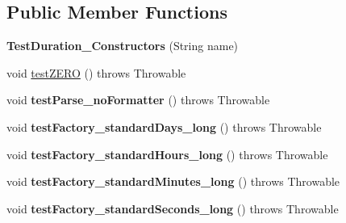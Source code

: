 \subsection*{Public Member Functions}
\begin{DoxyCompactItemize}
\item 
\hypertarget{classorg_1_1joda_1_1time_1_1_test_duration___constructors_aaa9960e3e894d063e7a536c8a3e4f598}{{\bfseries Test\-Duration\-\_\-\-Constructors} (String name)}\label{classorg_1_1joda_1_1time_1_1_test_duration___constructors_aaa9960e3e894d063e7a536c8a3e4f598}

\item 
void \hyperlink{classorg_1_1joda_1_1time_1_1_test_duration___constructors_a2bf73282bf9030fbbede3792757c108d}{test\-Z\-E\-R\-O} ()  throws Throwable 
\item 
\hypertarget{classorg_1_1joda_1_1time_1_1_test_duration___constructors_a03d70f5ef15df5aa9837e916fb08fac9}{void {\bfseries test\-Parse\-\_\-no\-Formatter} ()  throws Throwable }\label{classorg_1_1joda_1_1time_1_1_test_duration___constructors_a03d70f5ef15df5aa9837e916fb08fac9}

\item 
\hypertarget{classorg_1_1joda_1_1time_1_1_test_duration___constructors_afa349a990d31c019386716c2e4c9998a}{void {\bfseries test\-Factory\-\_\-standard\-Days\-\_\-long} ()  throws Throwable }\label{classorg_1_1joda_1_1time_1_1_test_duration___constructors_afa349a990d31c019386716c2e4c9998a}

\item 
\hypertarget{classorg_1_1joda_1_1time_1_1_test_duration___constructors_a8a921503d13a34eccce9e5d46bfadfe5}{void {\bfseries test\-Factory\-\_\-standard\-Hours\-\_\-long} ()  throws Throwable }\label{classorg_1_1joda_1_1time_1_1_test_duration___constructors_a8a921503d13a34eccce9e5d46bfadfe5}

\item 
\hypertarget{classorg_1_1joda_1_1time_1_1_test_duration___constructors_a884f44931d26ad6f3ac1f2f514fc6dc2}{void {\bfseries test\-Factory\-\_\-standard\-Minutes\-\_\-long} ()  throws Throwable }\label{classorg_1_1joda_1_1time_1_1_test_duration___constructors_a884f44931d26ad6f3ac1f2f514fc6dc2}

\item 
\hypertarget{classorg_1_1joda_1_1time_1_1_test_duration___constructors_aeb4bae613eba58f1468fd9021e5b0b57}{void {\bfseries test\-Factory\-\_\-standard\-Seconds\-\_\-long} ()  throws Throwable }\label{classorg_1_1joda_1_1time_1_1_test_duration___constructors_aeb4bae613eba58f1468fd9021e5b0b57}


\end{DoxyCompactItemize}

